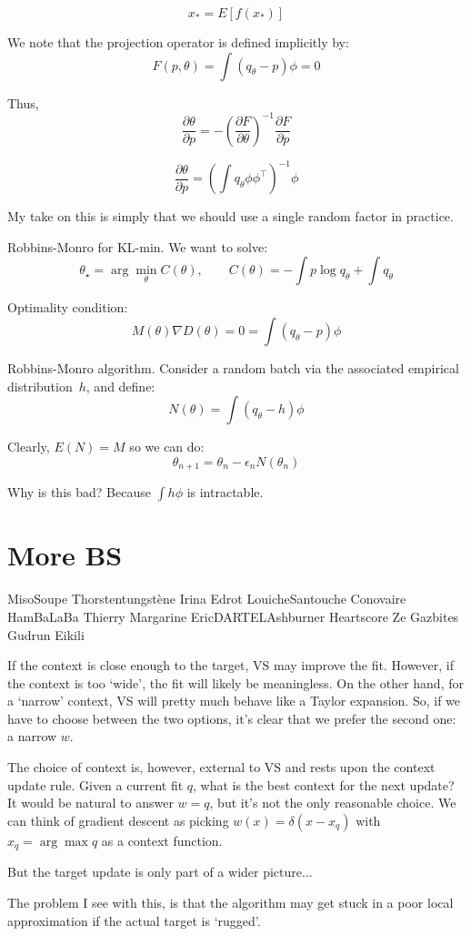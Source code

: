\documentclass{article}
\begin{document}
$$
x_* = E[f(x_*)] 
$$

We note that the projection operator is defined implicitly by:
$$
F(p,\theta) = \int (q_\theta-p)\phi = 0
$$

Thus, 
$$
\frac{\partial \theta}{\partial p}
= - \left(\frac{\partial F}{\partial \theta}\right)^{-1} \frac{\partial F}{\partial p}
$$

$$
\frac{\partial \theta}{\partial p} = \left(\int q_\theta \phi\phi^\top \right)^{-1} \phi
$$


My take on this is simply that we should use a single random factor in practice. 

Robbins-Monro for KL-min. We want to solve:
$$
\theta_\star = \arg\min_\theta C(\theta),
\qquad
C(\theta) = -\int p \log q_\theta + \int q_\theta
$$

Optimality condition:
$$
M(\theta)\nabla D(\theta) = 0 = \int (q_\theta-p)\phi
$$

Robbins-Monro algorithm. Consider a random batch via the associated empirical distribution~$h$, and define:
$$
N(\theta) = \int (q_\theta-h) \phi
$$

Clearly, $E(N)=M$ so we can do:
$$
\theta_{n+1} = \theta_n - \epsilon_n N(\theta_n)
$$

Why is this bad? Because $\int h\phi$ is intractable.




\section{More BS}


MisoSoupe
Thorstentungstène
Irina
Edrot
LouicheSantouche
Conovaire
HamBaLaBa
Thierry Margarine
EricDARTELAshburner
Heartscore
Ze Gazbites
Gudrun Eikili

If the context is close enough to the target, VS may improve the fit. However, if the context is too `wide', the fit will likely be meaningless. On the other hand, for a `narrow' context, VS will pretty much behave like a Taylor expansion. So, if we have to choose between the two options, it's clear that we prefer the second one: a narrow $w$.

The choice of context is, however, external to VS and rests upon the context update rule. Given a current fit $q$, what is the best context for the next update? It would be natural to answer $w=q$, but it's not the only reasonable choice. We can think of gradient descent as picking $w(x)=\delta(x-x_q)$ with $x_q=\arg\max q$ as a context function.

But the target update is only part of a wider picture...

The problem I see with this, is that the algorithm may get stuck in a poor local approximation if the actual target is `rugged'.






\end{document}
